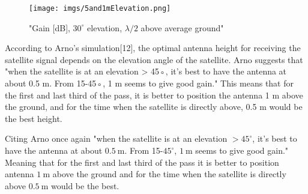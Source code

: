 \documentclass{article}
\begin{document}
\begin{itemize}
\begin{itemize}
            \begin{figure}[H]
                \centering
                \texttt{[image: imgs/5and1mElevation.png]}
                \caption{"Gain [dB], $30^{\circ}$ elevation, $\lambda/2$ above average ground" \cite{13}}
                \label{arno-elev}
            \end{figure}

            According to Arno's simulation[12], the optimal antenna height for receiving the satellite signal depends on the elevation angle of the satellite. Arno suggests that "when the satellite is at an elevation > 45◦, it’s best to have the antenna at about 0.5 m. From 15-45◦, 1 m seems to give good gain." This means that for the first and last third of the pass, it is better to position the antenna 1 m above the ground, and for the time when the satellite is directly above, 0.5 m would be the best height.

            Citing Arno once again "when the satellite is at an elevation $>45^{\circ}$, it’s best to have the antenna at about $\SI{0.5}{\metre}$. From 15-$45^{\circ}$, $\SI{1}{\metre}$ seems to give good gain." Meaning that for the first and last third of the pass it is better to position antenna $\SI{1}{\metre}$ above the ground and for the time when the satellite is directly above $\SI{0.5}{\metre}$ would be the best.
            
        \end{itemize}

    \end{itemize}
        
\end{document}
